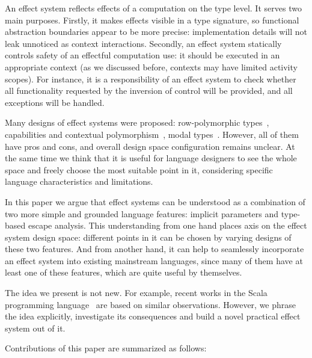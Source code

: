\documentclass[acmsmall]{acmart}
\begin{document}
An effect system reflects effects of a computation on the type level.
It serves two main purposes.
Firstly, it makes effects visible in a type signature, so functional abstraction boundaries appear to be more precise: implementation details will not leak unnoticed as context interactions.
Secondly, an effect system statically controls safety of an effectful computation use: it should be executed in an appropriate context (as we discussed before, contexts may have limited activity scopes).
For instance, it is a responsibility of an effect system to check whether all functionality requested by the inversion of control will be provided, and all exceptions will be handled.

Many designs of effect systems were proposed: row-polymorphic types~\cite{leijen2014koka}, capabilities and contextual polymorphism~\cite{brachthauser2022effects, boruch2023capturing}, modal types~\cite{tang2024modal}. %
However, all of them have pros and cons, and overall design space configuration remains unclear.
At the same time we think that it is useful for language designers to see the whole space and freely choose the most suitable point in it, considering specific language characteristics and limitations.

In this paper we argue that effect systems can be understood as a combination of two more simple and grounded language features: implicit parameters and type-based escape analysis.
This understanding from one hand places axis on the effect system design space: different points in it can be chosen by varying designs of these two features.
And from another hand, it can help to seamlessly incorporate an effect system into existing mainstream languages, since many of them have at least one of these features, which are quite useful by themselves.

The idea we present is not new.
For example, recent works in the Scala programming language~\cite{boruch2023capturing} are based on similar observations.
However, we phrase the idea explicitly, investigate its consequences and build a novel practical effect system out of it.


Contributions of this paper are summarized as follows:
\end{document}

